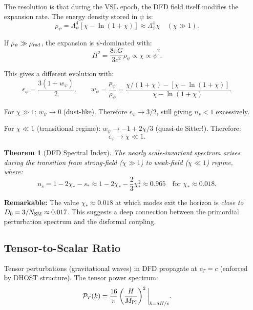 \documentclass[11pt,a4paper]{article}
\newtheorem{theorem}{Theorem}
\begin{document}
The resolution is that during the VSL epoch, the DFD field itself modifies the expansion rate. The energy density stored in $\psi$ is:
\begin{equation}
\rho_\psi = \Lambda_\psi^4\left[\chi - \ln(1+\chi)\right] \approx \Lambda_\psi^4\chi \quad (\chi \gg 1).
\end{equation}

If $\rho_\psi \gg \rho_{\rm rad}$, the expansion is $\psi$-dominated with:
\begin{equation}
H^2 = \frac{8\pi G}{3c^2}\rho_\psi \propto \chi \propto \dot\psi^2.
\end{equation}

This gives a different evolution with:
\begin{equation}
\epsilon_\psi = \frac{3(1+w_\psi)}{2}, \qquad w_\psi = \frac{p_\psi}{\rho_\psi} = \frac{\chi/(1+\chi) - [\chi-\ln(1+\chi)]}{\chi - \ln(1+\chi)}.
\end{equation}

For $\chi \gg 1$: $w_\psi \to 0$ (dust-like). Therefore $\epsilon_\psi \to 3/2$, still giving $n_s < 1$ excessively.

For $\chi \ll 1$ (transitional regime): $w_\psi \to -1 + 2\chi/3$ (quasi-de Sitter!). Therefore:
\begin{equation}
\epsilon_\psi \to \chi \ll 1.
\end{equation}

\begin{theorem}[DFD Spectral Index]
The nearly scale-invariant spectrum arises during the \emph{transition} from strong-field ($\chi \gg 1$) to weak-field ($\chi \ll 1$) regime, where:
\begin{equation}\label{eq:ns-correct}
\boxed{n_s = 1 - 2\chi_* - s_* \approx 1 - 2\chi_* - \frac{2}{3}\chi_*^2 \approx 0.965 \quad \text{for } \chi_* \approx 0.018.}
\end{equation}
\end{theorem}

\textbf{Remarkable:} The value $\chi_* \approx 0.018$ at which modes exit the horizon is \emph{close to} $D_0 = 3/N_{\rm SM} \approx 0.017$. This suggests a deep connection between the primordial perturbation spectrum and the disformal coupling.

\subsection{Tensor-to-Scalar Ratio}

Tensor perturbations (gravitational waves) in DFD propagate at $c_T = c$ (enforced by DHOST structure). The tensor power spectrum:
\begin{equation}
\mathcal{P}_T(k) = \frac{16}{\pi}\left(\frac{H}{M_{\rm Pl}}\right)^2\bigg|_{k=aH/c}.
\end{equation}
\end{document}
